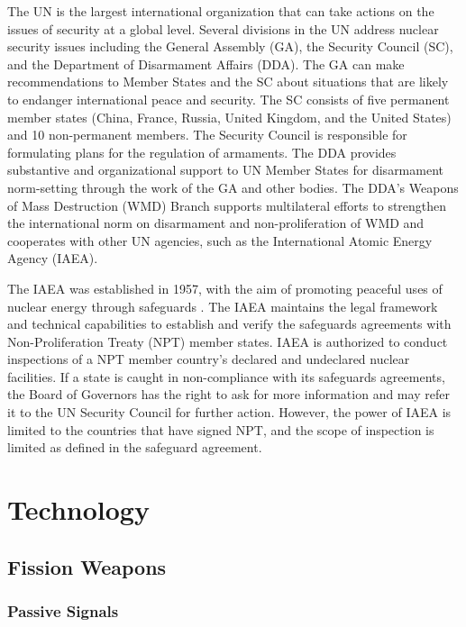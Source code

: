 \documentclass{report}
\begin{document}
The UN is the largest international organization that can take actions on the issues of security at a global level. Several divisions in the UN address nuclear security issues including the General Assembly (GA), the Security Council (SC), and the Department of Disarmament Affairs (DDA). The GA can make recommendations to Member States and the SC about situations that are likely to endanger international peace and security. The SC consists of five permanent member states (China, France, Russia, United Kingdom, and the United States) and 10 non-permanent members. The Security Council is responsible for formulating plans for the regulation of armaments. The DDA provides substantive and organizational support to UN Member States for disarmament norm-setting through the work of the GA and other bodies. The DDA's Weapons of Mass Destruction (WMD) Branch supports multilateral efforts to strengthen the international norm on disarmament and non-proliferation of WMD and cooperates with other UN agencies, such as the International Atomic Energy Agency (IAEA).

The IAEA was established in 1957, with the aim of promoting peaceful uses of nuclear energy through safeguards \cite{InternationalAtomicEnergyAgency}. The IAEA maintains the legal framework and technical capabilities to establish and verify the safeguards agreements with Non-Proliferation Treaty (NPT) member states. IAEA is authorized to conduct inspections of a NPT member country's declared and undeclared nuclear facilities. If a state is caught in non-compliance with its safeguards agreements, the Board of Governors has the right to ask for more information and may refer it to the UN Security Council for further action. However, the power of IAEA is limited to the countries that have signed NPT, and the scope of inspection is limited as defined in the safeguard agreement. 






\chapter[Appendix D: Technology]{Technology} \label{app:tech}


\section{Fission Weapons}
 
   \subsection{Passive Signals}
\end{document}
